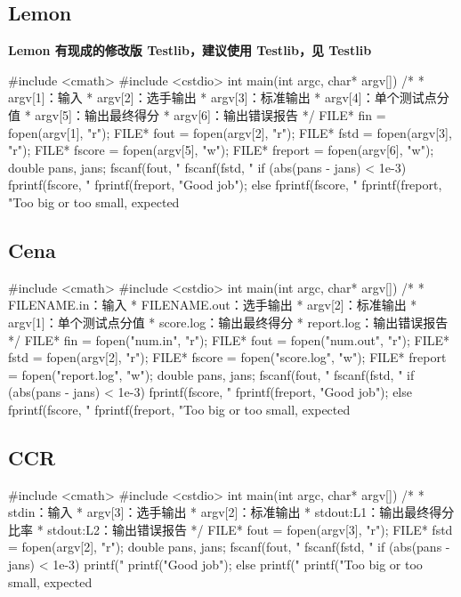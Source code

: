 \subsection{Lemon}

\textbf{Lemon 有现成的修改版 Testlib，建议使用 Testlib，见  Testlib }

\begin{cppcode}
#include <cmath>
#include <cstdio>
int main(int argc, char* argv[]) {
  /*
   * argv[1]：输入
   * argv[2]：选手输出
   * argv[3]：标准输出
   * argv[4]：单个测试点分值
   * argv[5]：输出最终得分
   * argv[6]：输出错误报告
   */
  FILE* fin = fopen(argv[1], "r");
  FILE* fout = fopen(argv[2], "r");
  FILE* fstd = fopen(argv[3], "r");
  FILE* fscore = fopen(argv[5], "w");
  FILE* freport = fopen(argv[6], "w");
  double pans, jans;
  fscanf(fout, "%
  fscanf(fstd, "%
  if (abs(pans - jans) < 1e-3) {
    fprintf(fscore, "%
    fprintf(freport, "Good job");
  } else {
    fprintf(fscore, "%
    fprintf(freport, "Too big or too small, expected %
  }
}
\end{cppcode}

\subsection{Cena}

\begin{cppcode}
#include <cmath>
#include <cstdio>
int main(int argc, char* argv[]) {
  /*
   * FILENAME.in：输入
   * FILENAME.out：选手输出
   * argv[2]：标准输出
   * argv[1]：单个测试点分值
   * score.log：输出最终得分
   * report.log：输出错误报告
   */
  FILE* fin = fopen("num.in", "r");
  FILE* fout = fopen("num.out", "r");
  FILE* fstd = fopen(argv[2], "r");
  FILE* fscore = fopen("score.log", "w");
  FILE* freport = fopen("report.log", "w");
  double pans, jans;
  fscanf(fout, "%
  fscanf(fstd, "%
  if (abs(pans - jans) < 1e-3) {
    fprintf(fscore, "%
    fprintf(freport, "Good job");
  } else {
    fprintf(fscore, "%
    fprintf(freport, "Too big or too small, expected %
  }
}
\end{cppcode}

\subsection{CCR}

\begin{cppcode}
#include <cmath>
#include <cstdio>
int main(int argc, char* argv[]) {
  /*
   * stdin：输入
   * argv[3]：选手输出
   * argv[2]：标准输出
   * stdout:L1：输出最终得分比率
   * stdout:L2：输出错误报告
   */
  FILE* fout = fopen(argv[3], "r");
  FILE* fstd = fopen(argv[2], "r");
  double pans, jans;
  fscanf(fout, "%
  fscanf(fstd, "%
  if (abs(pans - jans) < 1e-3) {
    printf("%
    printf("Good job");
  } else {
    printf("%
    printf("Too big or too small, expected %
  }
}
\end{cppcode}

